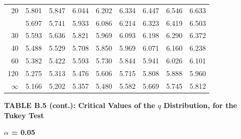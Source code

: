 \documentclass[10pt]{article}
\begin{document}
\begin{longtable}{@{}r!{\vrule width 0.8pt\hspace{0.55em}}rrrrrrrr@{}}
20 & 5.801 & 5.847 & 6.044 & 6.202 & 6.334 & 6.447 & 6.546 & 6.633 \\
 & 5.697 & 5.741 & 5.933 & 6.086 & 6.214 & 6.323 & 6.419 & 6.503 \\
30 & 5.593 & 5.636 & 5.821 & 5.969 & 6.093 & 6.198 & 6.290 & 6.372 \\
40 & 5.488 & 5.529 & 5.708 & 5.850 & 5.969 & 6.071 & 6.160 & 6.238 \\
60 & 5.382 & 5.422 & 5.593 & 5.730 & 5.844 & 5.941 & 6.026 & 6.101 \\
120 & 5.275 & 5.313 & 5.476 & 5.606 & 5.715 & 5.808 & 5.888 & 5.960 \\
\addlinespace[0.30em]
$\infty$ & 5.166 & 5.202 & 5.357 & 5.480 & 5.582 & 5.669 & 5.745 & 5.812 \\
\end{longtable}
\newpage
\thispagestyle{empty}
\begin{center}
{\large\bfseries TABLE B.5 (cont.): Critical Values of the $q$ Distribution, for the Tukey Test\par}
\end{center}
{\large\bfseries $\alpha$ = 0.05\par}
\vspace{0.45em}
\small
\end{document}
